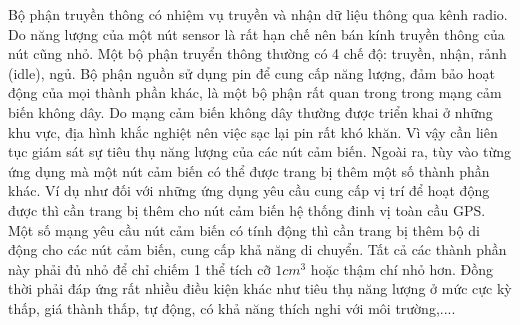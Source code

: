 \documentclass{article}
\begin{document}
\newline Bộ phận truyền thông có nhiệm vụ truyền và nhận dữ liệu thông qua kênh radio. Do năng lượng của một nút sensor là rất hạn chế nên bán kính truyền thông của nút cũng nhỏ. Một bộ phận truyển thông thường có 4 chế độ: truyền, nhận, rảnh (idle), ngủ. 
\newline Bộ phận nguồn sử dụng pin để cung cấp năng lượng, đảm bảo hoạt động của mọi thành phần khác, là một bộ phận rất quan trong trong mạng cảm biến không dây. Do mạng cảm biến không dây thường được triển khai ở những khu vực, địa hình khắc nghiệt nên việc sạc lại pin rất khó khăn. Vì vậy cần liên tục giám sát sự tiêu thụ năng lượng của các nút cảm biến. 
\newline Ngoài ra, tùy vào từng ứng dụng mà một nút cảm biến có thể được trang bị thêm một số thành phần khác. Ví dụ như đối với những ứng dụng yêu cầu cung cấp vị trí để hoạt động được thì cần trang bị thêm cho nút cảm biến hệ thống đinh vị toàn cầu \gls{GPS}. Một số mạng yêu cầu nút cảm biến có tính động thì cần trang bị thêm bộ di động cho các nút cảm biến, cung cấp khả năng di chuyển.
\newline Tất cả các thành phần này phải đủ nhỏ để chỉ chiếm 1 thể tích cỡ $1cm^3$ hoặc thậm chí nhỏ hơn. Đồng thời phải đáp ứng rất nhiều điều kiện khác như tiêu thụ năng lượng ở mức cực kỳ thấp, giá thành thấp, tự động, có khả năng thích nghi với môi trường,....
\end{document}
